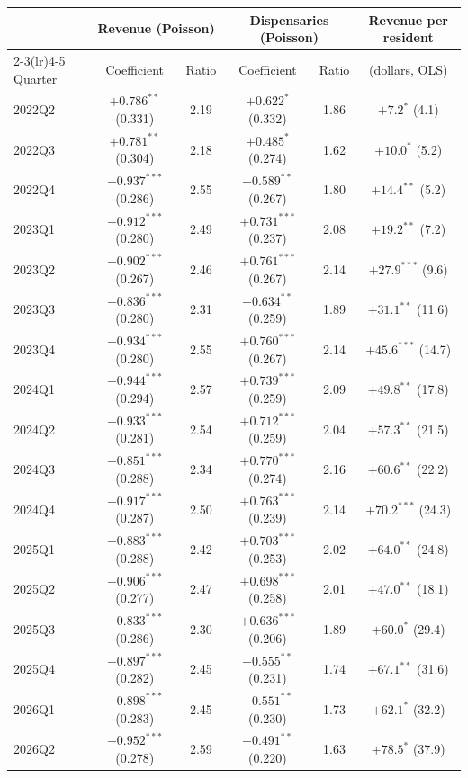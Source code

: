 \begin{tabular}{@{}lccccc@{}}
\toprule
 & \multicolumn{2}{c}{Revenue (Poisson)} & \multicolumn{2}{c}{Dispensaries (Poisson)} & Revenue per resident \\
\cmidrule(lr){2-3}\cmidrule(lr){4-5}
Quarter & Coefficient & Ratio & Coefficient & Ratio & (dollars, OLS) \\
\midrule
2022Q2 & $+0.786^{**}$ (0.331) & 2.19 & $+0.622^{*}$ (0.332) & 1.86 & $+7.2^{*}$ (4.1) \\
2022Q3 & $+0.781^{**}$ (0.304) & 2.18 & $+0.485^{*}$ (0.274) & 1.62 & $+10.0^{*}$ (5.2) \\
2022Q4 & $+0.937^{***}$ (0.286) & 2.55 & $+0.589^{**}$ (0.267) & 1.80 & $+14.4^{**}$ (5.2) \\
2023Q1 & $+0.912^{***}$ (0.280) & 2.49 & $+0.731^{***}$ (0.237) & 2.08 & $+19.2^{**}$ (7.2) \\
2023Q2 & $+0.902^{***}$ (0.267) & 2.46 & $+0.761^{***}$ (0.267) & 2.14 & $+27.9^{***}$ (9.6) \\
2023Q3 & $+0.836^{***}$ (0.280) & 2.31 & $+0.634^{**}$ (0.259) & 1.89 & $+31.1^{**}$ (11.6) \\
2023Q4 & $+0.934^{***}$ (0.280) & 2.55 & $+0.760^{***}$ (0.267) & 2.14 & $+45.6^{***}$ (14.7) \\
2024Q1 & $+0.944^{***}$ (0.294) & 2.57 & $+0.739^{***}$ (0.259) & 2.09 & $+49.8^{**}$ (17.8) \\
2024Q2 & $+0.933^{***}$ (0.281) & 2.54 & $+0.712^{***}$ (0.259) & 2.04 & $+57.3^{**}$ (21.5) \\
2024Q3 & $+0.851^{***}$ (0.288) & 2.34 & $+0.770^{***}$ (0.274) & 2.16 & $+60.6^{**}$ (22.2) \\
2024Q4 & $+0.917^{***}$ (0.287) & 2.50 & $+0.763^{***}$ (0.239) & 2.14 & $+70.2^{***}$ (24.3) \\
2025Q1 & $+0.883^{***}$ (0.288) & 2.42 & $+0.703^{***}$ (0.253) & 2.02 & $+64.0^{**}$ (24.8) \\
2025Q2 & $+0.906^{***}$ (0.277) & 2.47 & $+0.698^{***}$ (0.258) & 2.01 & $+47.0^{**}$ (18.1) \\
2025Q3 & $+0.833^{***}$ (0.286) & 2.30 & $+0.636^{***}$ (0.206) & 1.89 & $+60.0^{*}$ (29.4) \\
2025Q4 & $+0.897^{***}$ (0.282) & 2.45 & $+0.555^{**}$ (0.231) & 1.74 & $+67.1^{**}$ (31.6) \\
2026Q1 & $+0.898^{***}$ (0.283) & 2.45 & $+0.551^{**}$ (0.230) & 1.73 & $+62.1^{*}$ (32.2) \\
2026Q2 & $+0.952^{***}$ (0.278) & 2.59 & $+0.491^{**}$ (0.220) & 1.63 & $+78.5^{*}$ (37.9) \\
\bottomrule
\end{tabular}
